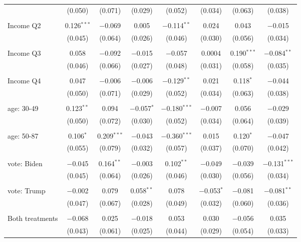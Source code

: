 \begin{tabular}{@{\extracolsep{5pt}}lccccccc}
  & (0.050) & (0.071) & (0.029) & (0.052) & (0.034) & (0.063) & (0.038) \\ 
  & & & & & & & \\ 
 Income Q2 & 0.126$^{***}$ & $-$0.069 & 0.005 & $-$0.114$^{**}$ & 0.024 & 0.043 & $-$0.015 \\ 
  & (0.045) & (0.064) & (0.026) & (0.046) & (0.030) & (0.056) & (0.034) \\ 
  & & & & & & & \\ 
 Income Q3 & 0.058 & $-$0.092 & $-$0.015 & $-$0.057 & 0.0004 & 0.190$^{***}$ & $-$0.084$^{**}$ \\ 
  & (0.046) & (0.066) & (0.027) & (0.048) & (0.031) & (0.058) & (0.035) \\ 
  & & & & & & & \\ 
 Income Q4 & 0.047 & $-$0.006 & $-$0.006 & $-$0.129$^{**}$ & 0.021 & 0.118$^{*}$ & $-$0.044 \\ 
  & (0.050) & (0.071) & (0.029) & (0.052) & (0.034) & (0.063) & (0.038) \\ 
  & & & & & & & \\ 
 age: 30-49 & 0.123$^{**}$ & 0.094 & $-$0.057$^{*}$ & $-$0.180$^{***}$ & $-$0.007 & 0.056 & $-$0.029 \\ 
  & (0.050) & (0.072) & (0.030) & (0.052) & (0.034) & (0.064) & (0.039) \\ 
  & & & & & & & \\ 
 age: 50-87 & 0.106$^{*}$ & 0.209$^{***}$ & $-$0.043 & $-$0.360$^{***}$ & 0.015 & 0.120$^{*}$ & $-$0.047 \\ 
  & (0.055) & (0.079) & (0.032) & (0.057) & (0.037) & (0.070) & (0.042) \\ 
  & & & & & & & \\ 
 vote: Biden & $-$0.045 & 0.164$^{**}$ & $-$0.003 & 0.102$^{**}$ & $-$0.049 & $-$0.039 & $-$0.131$^{***}$ \\ 
  & (0.045) & (0.064) & (0.026) & (0.046) & (0.030) & (0.056) & (0.034) \\ 
  & & & & & & & \\ 
 vote: Trump & $-$0.002 & 0.079 & 0.058$^{**}$ & 0.078 & $-$0.053$^{*}$ & $-$0.081 & $-$0.081$^{**}$ \\ 
  & (0.047) & (0.067) & (0.028) & (0.049) & (0.032) & (0.060) & (0.036) \\ 
  & & & & & & & \\ 
 Both treatments & $-$0.068 & 0.025 & $-$0.018 & 0.053 & 0.030 & $-$0.056 & 0.035 \\ 
  & (0.043) & (0.061) & (0.025) & (0.044) & (0.029) & (0.054) & (0.033) \\ 

\end{tabular}
